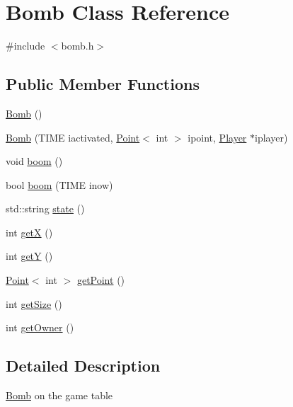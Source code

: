 \hypertarget{class_bomb}{\section{Bomb Class Reference}
\label{class_bomb}
}


{\ttfamily \#include $<$bomb.\-h$>$}

\subsection*{Public Member Functions}
\begin{DoxyCompactItemize}
\item 
\hyperlink{class_bomb_a5805401b6cfbb451cf31ebd4851740cf}{Bomb} ()
\item 
\hyperlink{class_bomb_a03c2cd4e1bfa472de74d5deb29066f11}{Bomb} (T\-I\-M\-E iactivated, \hyperlink{class_point}{Point}$<$ int $>$ ipoint, \hyperlink{class_player}{Player} $\ast$iplayer)
\item 
void \hyperlink{class_bomb_a1e4a85025c5b31a9e1d7e9200e3e4e90}{boom} ()
\item 
bool \hyperlink{class_bomb_a60cd514206385870458e02327143070f}{boom} (T\-I\-M\-E inow)
\item 
std\-::string \hyperlink{class_bomb_a856d0fab5a4c401a8b3e153dd063d604}{state} ()
\item 
int \hyperlink{class_bomb_a3ed5889d36fa63a00162b92b84a7c363}{get\-X} ()
\item 
int \hyperlink{class_bomb_a1c07f26ec95a76bfca5ecf633e7913a8}{get\-Y} ()
\item 
\hyperlink{class_point}{Point}$<$ int $>$ \hyperlink{class_bomb_a9d2af1296b33a4c06b6b36c8aaf4d45e}{get\-Point} ()
\item 
int \hyperlink{class_bomb_acd1ab69615d334bdbe7f43342c8857e4}{get\-Size} ()
\item 
int \hyperlink{class_bomb_ab2646fe8e30483a297481e6ee7aa728f}{get\-Owner} ()
\end{DoxyCompactItemize}


\subsection{Detailed Description}
\hyperlink{class_bomb}{Bomb} on the game table 


